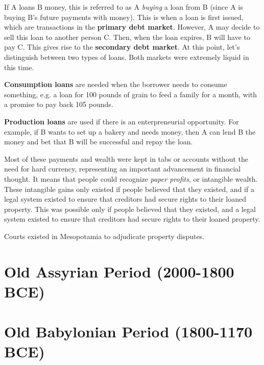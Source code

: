 \documentclass{article}
\begin{document}
    If A loans B money, this is referred to as A \textit{buying} a loan from B (since A is buying B's future payments with money). This is when a loan is first issued, which are transactions in the \textbf{primary debt market}. However, A may decide to sell this loan to another person C. Then, when the loan expires, B will have to pay C. This gives rise to the \textbf{secondary debt market}. At this point, let's distinguish between two types of loans. Both markets were extremely liquid in this time. 

    \begin{definition}
      \label{def:consumption-loans}
      \textbf{Consumption loans} are needed when the borrower needs to consume something, e.g. a loan for 100 pounds of grain to feed a family for a month, with a promise to pay back 105 pounds.  
    \end{definition}

    \begin{definition}
      \label{def:production-loans}
      \textbf{Production loans} are used if there is an enterpreneurial opportunity. For example, if B wants to set up a bakery and needs money, then A can lend B the money and bet that B will be successful and repay the loan.  
    \end{definition}

    Most of these payments and wealth were kept in tabs or accounts without the need for hard currency, representing an important advancement in financial thought. It means that people could recognize \textit{paper profits}, or intangible wealth. These intangible gains only existed if people believed that they existed, and if a legal system existed to ensure that creditors had secure rights to their loaned property. This was possible only if people believed that they existed, and a legal system existed to ensure that creditors had secure rights to their loaned property. 

    \begin{legal}
      Courts existed in Mesopotamia to adjudicate property disputes. 
    \end{legal}

\section{Old Assyrian Period (2000-1800 BCE)}


\section{Old Babylonian Period (1800-1170 BCE)}
\end{document}
